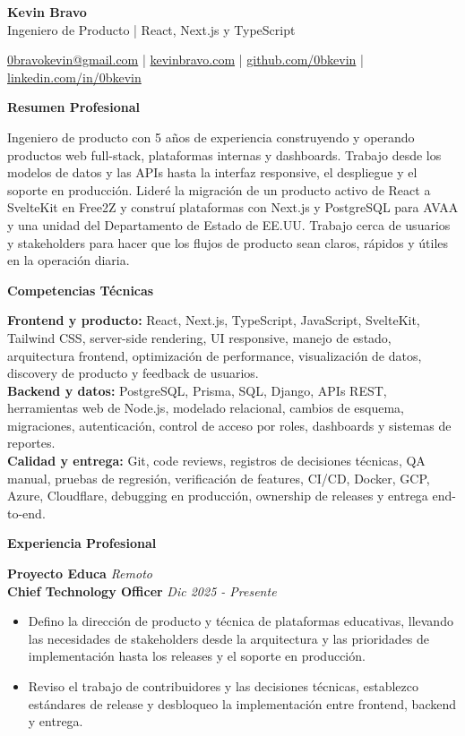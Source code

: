 \documentclass[10pt]{article}
\newcommand{\sectiontitle}[1]{%
    \vspace{4pt}
    \begin{center}
        \textbf{#1}
    \end{center}
    \vspace{-5pt}
}
\begin{document}
\raggedright

\begin{center}
    {\LARGE \textbf{Kevin Bravo}}\\
    Ingeniero de Producto | React, Next.js y TypeScript \\
    \hrulefill
\end{center}

\begin{center}
    \href{mailto:0bravokevin@gmail.com}{0bravokevin@gmail.com}
    | \href{https://kevinbravo.com}{kevinbravo.com}
    | \href{https://github.com/0bkevin}{github.com/0bkevin}
    | \href{https://www.linkedin.com/in/0bkevin}{linkedin.com/in/0bkevin}
\end{center}

\fontsize{9.45}{10.35}\selectfont

\sectiontitle{Resumen Profesional}
Ingeniero de producto con 5 años de experiencia construyendo y operando productos web full-stack, plataformas internas y dashboards. Trabajo desde los modelos de datos y las APIs hasta la interfaz responsive, el despliegue y el soporte en producción. Lideré la migración de un producto activo de React a SvelteKit en Free2Z y construí plataformas con Next.js y PostgreSQL para AVAA y una unidad del Departamento de Estado de EE.UU. Trabajo cerca de usuarios y stakeholders para hacer que los flujos de producto sean claros, rápidos y útiles en la operación diaria.

\sectiontitle{Competencias Técnicas}
\textbf{Frontend y producto:} React, Next.js, TypeScript, JavaScript, SvelteKit, Tailwind CSS, server-side rendering, UI responsive, manejo de estado, arquitectura frontend, optimización de performance, visualización de datos, discovery de producto y feedback de usuarios. \\
\textbf{Backend y datos:} PostgreSQL, Prisma, SQL, Django, APIs REST, herramientas web de Node.js, modelado relacional, cambios de esquema, migraciones, autenticación, control de acceso por roles, dashboards y sistemas de reportes. \\
\textbf{Calidad y entrega:} Git, code reviews, registros de decisiones técnicas, QA manual, pruebas de regresión, verificación de features, CI/CD, Docker, GCP, Azure, Cloudflare, debugging en producción, ownership de releases y entrega end-to-end.

\sectiontitle{Experiencia Profesional}
\textbf{Proyecto Educa} \hfill \textit{Remoto} \\
\textbf{Chief Technology Officer} \hfill \textit{Dic 2025 - Presente}
\begin{itemize}
    \item Defino la dirección de producto y técnica de plataformas educativas, llevando las necesidades de stakeholders desde la arquitectura y las prioridades de implementación hasta los releases y el soporte en producción.
    \item Reviso el trabajo de contribuidores y las decisiones técnicas, establezco estándares de release y desbloqueo la implementación entre frontend, backend y entrega.
\end{itemize}
\end{document}
